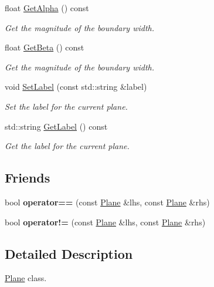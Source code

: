 \begin{DoxyCompactItemize}
float \hyperlink{classcalib_1_1Plane_a81ab693d29f1090b001bbfdcda1c3dfd}{Get\-Alpha} () const 
\begin{DoxyCompactList}\small\item\em Get the magnitude of the boundary width. \end{DoxyCompactList}\item 
float \hyperlink{classcalib_1_1Plane_ab20c955965d393d0deb596cea9950134}{Get\-Beta} () const 
\begin{DoxyCompactList}\small\item\em Get the magnitude of the boundary width. \end{DoxyCompactList}\item 
void \hyperlink{classcalib_1_1Plane_aa34717e7d8c88067c5b9c403d8debb7a}{Set\-Label} (const std\-::string \&label)
\begin{DoxyCompactList}\small\item\em Set the label for the current plane. \end{DoxyCompactList}\item 
std\-::string \hyperlink{classcalib_1_1Plane_adbc591dfae1513a6660c50d167cd0047}{Get\-Label} () const 
\begin{DoxyCompactList}\small\item\em Get the label for the current plane. \end{DoxyCompactList}\end{DoxyCompactItemize}
\subsection*{Friends}
\begin{DoxyCompactItemize}
\item 
\hypertarget{classcalib_1_1Plane_adc0e0328f02eb878280e93ab31fec710}{bool {\bfseries operator==} (const \hyperlink{classcalib_1_1Plane}{Plane} \&lhs, const \hyperlink{classcalib_1_1Plane}{Plane} \&rhs)}\label{classcalib_1_1Plane_adc0e0328f02eb878280e93ab31fec710}

\item 
\hypertarget{classcalib_1_1Plane_a58f6b3715b6239cefcdc262a880d1088}{bool {\bfseries operator!=} (const \hyperlink{classcalib_1_1Plane}{Plane} \&lhs, const \hyperlink{classcalib_1_1Plane}{Plane} \&rhs)}\label{classcalib_1_1Plane_a58f6b3715b6239cefcdc262a880d1088}

\end{DoxyCompactItemize}


\subsection{Detailed Description}
\hyperlink{classcalib_1_1Plane}{Plane} class. 

